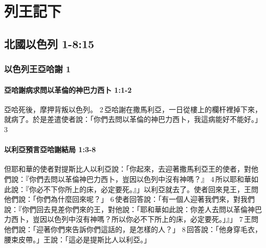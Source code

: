 
\chapter{列王記下}
\section{北國以色列 1-8:15 }
\subsection{以色列王亞哈謝 1}
\subsubsection{亞哈謝病求問以革倫的神巴力西卜 1:1-2}
亞哈死後，摩押背叛以色列。 2 亞哈謝在撒馬利亞，一日從樓上的欄杆裡掉下來，就病了。於是差遣使者說：「你們去問以革倫的神巴力西卜，我這病能好不能好。」 3 


\subsubsection{以利亞預言亞哈謝結局 1:3-8}
但耶和華的使者對提斯比人以利亞說：「你起來，去迎著撒馬利亞王的使者，對他們說：『你們去問以革倫神巴力西卜，豈因以色列中沒有神嗎？』 4 所以耶和華如此說：『你必不下你所上的床，必定要死。』」以利亞就去了。使者回來見王，王問他們說：「你們為什麼回來呢？」 6 使者回答說：「有一個人迎著我們來，對我們說：『你們回去見差你們來的王，對他說：「耶和華如此說：你差人去問以革倫神巴力西卜，豈因以色列中沒有神嗎？所以你必不下所上的床，必定要死。」』」 7 王問他們說：「迎著你們來告訴你們這話的，是怎樣的人？」 8 回答說：「他身穿毛衣，腰束皮帶。」王說：「這必是提斯比人以利亞。」

